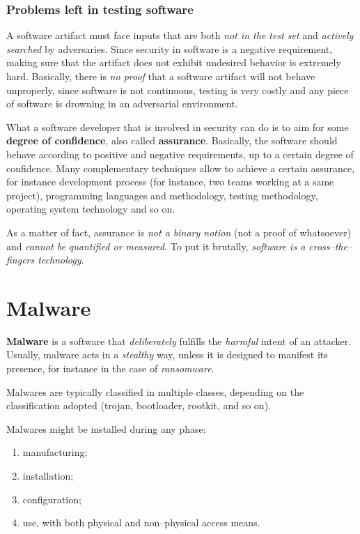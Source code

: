 \documentclass[10pt]{extreport}
\begin{document}
\subsubsection{Problems left in testing software}

A software artifact must face inputs that are both \emph{not in the test set}
and \emph{actively searched} by adversaries. Since security in software is a
negative requirement, making sure that the artifact does not exhibit undesired
behavior is extremely hard. Basically, there is \emph{no proof} that a software
artifact will not behave unproperly, since software is not continuous, testing
is very costly and any piece of software is drowning in an adversarial
environment.

What a software developer that is involved in security can do is to aim for
some \textbf{degree of confidence}, also called \textbf{assurance}. Basically,
the software should behave according to positive and negative requirements, up
to a certain degree of confidence. Many complementary techniques allow to
achieve a certain assurance, for instance development process (for instance,
two teams working at a same project), programming languages and methodology,
testing methodology, operating system technology and so on.

As a matter of fact, assurance is \emph{not a binary notion} (not a proof of
whatsoever) and \emph{cannot be quantified or measured}. To put it brutally,
\emph{software is a cross--the--fingers technology}.

\section{Malware}

\textbf{Malware} is a software that \emph{deliberately} fulfills the
\emph{harmful} intent of an attacker. Usually, malware acts in a
\emph{stealthy} way, unless it is designed to manifest its presence, for
instance in the case of \emph{ransomware}.

Malwares are typically classified in multiple classes, depending on the
classification adopted (trojan, bootloader, rootkit, and so on).

Malwares might be installed during any phase:
\begin{enumerate}
    \item manufacturing;
    \item installation;
    \item configuration;
    \item use, with both physical and non--physical access means.
\end{enumerate}
\end{document}
